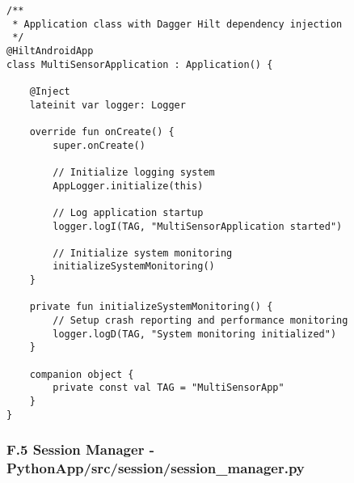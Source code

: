 \documentclass[12pt,a4paper]{article}
\begin{document}
\begin{verbatim}
/**
 * Application class with Dagger Hilt dependency injection
 */
@HiltAndroidApp
class MultiSensorApplication : Application() {
    
    @Inject
    lateinit var logger: Logger
    
    override fun onCreate() {
        super.onCreate()
        
        // Initialize logging system
        AppLogger.initialize(this)
        
        // Log application startup
        logger.logI(TAG, "MultiSensorApplication started")
        
        // Initialize system monitoring
        initializeSystemMonitoring()
    }
    
    private fun initializeSystemMonitoring() {
        // Setup crash reporting and performance monitoring
        logger.logD(TAG, "System monitoring initialized")
    }
    
    companion object {
        private const val TAG = "MultiSensorApp"
    }
}
\end{verbatim}

\subsubsection{F.5 Session Manager - PythonApp/src/session/session_manager.py}
\end{document}
